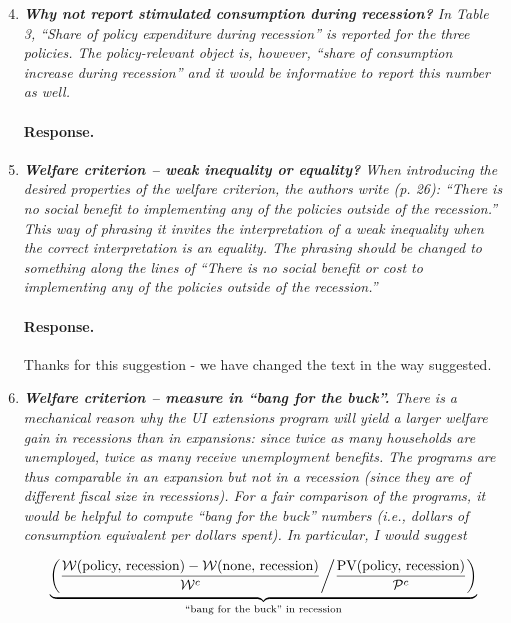 \documentclass[12pt,letterpaper,english]{article}
\begin{document}
\begin{enumerate}
\setcounter{enumi}{3}
	\item \textit{\textbf{Why not report stimulated consumption during recession?} In Table 3, ``Share of policy expenditure during recession'' is reported for the three policies. The policy-relevant object is, however, ``share of consumption increase during recession'' and it would be informative to report this number as well.} 
	 
	\paragraph{Response.} 

	\item \textit{\textbf{Welfare criterion – weak inequality or equality?} When introducing the desired properties of the welfare criterion, the authors write (p. 26): ``There is no social benefit to implementing any of the policies outside of the recession.'' This way of phrasing it invites the interpretation of a weak inequality when the correct interpretation	is an equality. The phrasing should be changed to something along the	lines of ``There is no social benefit or cost to implementing any of the policies outside of the recession.''}

	\paragraph{Response.} Thanks for this suggestion - we have changed the text in the way suggested.

	\item \textit{\textbf{Welfare criterion – measure in ``bang for the buck''.} There is a mechanical reason why the UI extensions program will yield a larger welfare gain in recessions than in expansions: since twice as many households are unemployed, twice as many receive unemployment benefits. The programs are thus comparable in an expansion	but not in a recession (since they are of different fiscal size in recessions).	For a fair comparison of the programs, it would be helpful to compute ``bang for the buck'' numbers (i.e., dollars of consumption equivalent per dollars spent). In particular, I would suggest} 
	
	\[ \underbrace{\left( \frac{\mathcal{W}(\text{policy, recession}) - \mathcal{W}(\text{none, recession})}{\mathcal{W}^c} \middle/ \frac{\text{PV}(\text{policy, recession})}{\mathcal{P}^c} \right)}_{\text{``bang for the buck'' in recession}} \]
	

\end{enumerate}
\end{document}
